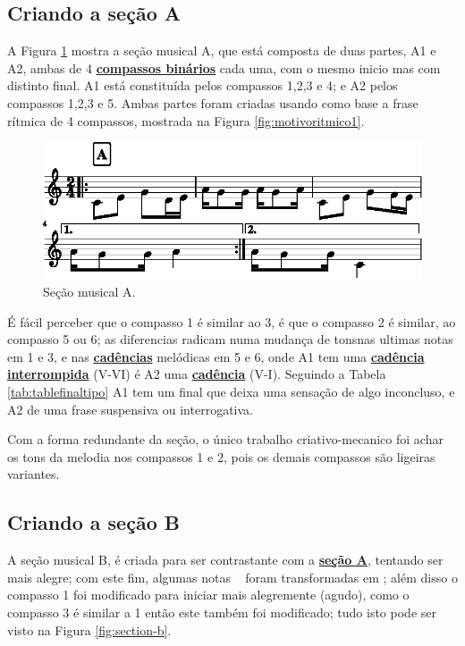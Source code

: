 \subsection{Criando a seção A}
\label{subsec:criandoa}
A Figura \ref{fig:section-a} mostra a seção musical A, 
que está composta de duas partes, A1 e A2, 
ambas de 4 \hyperref[subsec:compassobinario]{\textbf{compassos binários}} cada uma, com o mesmo inicio mas com distinto final.
A1 está constituída pelos compassos 1,2,3 e 4; e A2 pelos compassos 1,2,3 e 5.
Ambas partes foram criadas usando como base a frase rítmica de 4 compassos, mostrada na Figura \ref{fig:motivoritmico1}.
     \begin{figure}[H]
	     \centering
	     \includegraphics[width=\textwidth]{chapters/cap-musica-topicos/section-a-1.eps}
	     \caption{Seção musical A.}
	     \label{fig:section-a}
     \end{figure}
É fácil perceber que o compasso 1 é similar ao 3, é que o compasso 2 é similar, ao compasso 5 ou 6; 
as diferencias radicam numa mudança de tonsnas ultimas notas em 1 e 3, e nas \hyperref[subsec:cadenciamelodica]{\textbf{cadências}} melódicas em 5 e 6, 
onde A1 tem uma \hyperref[subsec:cadenciamelodica]{\textbf{cadência interrompida}} (V-VI) é A2 uma \hyperref[subsec:cadenciamelodica]{\textbf{cadência}} (V-I). 
Seguindo a Tabela \ref{tab:tablefinaltipo} A1 tem um final que deixa uma sensação de algo inconcluso,
e A2 de uma frase suspensiva ou interrogativa.

Com a forma redundante da seção, o único trabalho criativo-mecanico foi achar os tons da melodia nos compassos 1 e 2,
pois os demais compassos são ligeiras variantes.


\subsection{Criando a seção B}
\label{subsec:criandob}
A seção musical B, é criada para ser contrastante com a \hyperref[subsec:criandoa]{\textbf{seção A}},
tentando ser mais alegre;
com este fim, algumas notas \Acht~ foram transformadas em \Sech \Sech;
além disso o compasso 1 foi modificado para iniciar mais alegremente (agudo),
como o compasso 3 é similar a 1 então este também foi modificado;
tudo isto pode ser visto na  Figura \ref{fig:section-b}.


